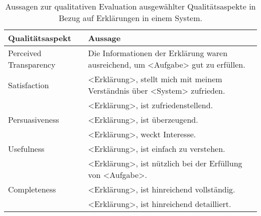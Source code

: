 \begin{table}[htb!]
    \begin{center}
        \begin{tabular}{|p{} p{}|}
            \hline
            \textbf{Qualitätsaspekt} & \textbf{Aussage} \\
            \hline
            \hline
            Perceived Transparency    & Die Informationen der Erklärung waren ausreichend, um <Aufgabe> gut zu erfüllen. 
                                \cite[vgl.][]{wang_is_2018, balog_measuring_2020} \\
            \hline
            Satisfaction    & <Erklärung>, stellt mich mit meinem Verständnis über <System> zufrieden.
                                \cite[vgl.][]{riveiro_thats_2021} \\
                            & <Erklärung>, ist zufriedenstellend.
                                \cite[vgl.][]{riveiro_thats_2021, hoffman_metrics_nodate, balog_measuring_2020} \\
            \hline
            Persuasiveness  & <Erklärung>, ist überzeugend.
                                \cite[vgl.][]{sato_action-triggering_2019, sato_context_nodate} \\
                            & <Erklärung>, weckt Interesse. 
                                \cite[vgl.][]{sato_action-triggering_2019, sato_context_nodate} \\
            \hline
            Usefulness      & <Erklärung>, ist einfach zu verstehen. 
                                \cite[vgl.][]{sato_action-triggering_2019, sato_context_nodate} \\
                            & <Erklärung>, ist nützlich bei der Erfüllung von <Aufgabe>.
                                \cite[vgl.][]{sato_action-triggering_2019, sato_context_nodate, hoffman_metrics_nodate, balog_measuring_2020} \\
            \hline
            Completeness    & <Erklärung>, ist hinreichend vollständig.
                                \cite[vgl.][]{hoffman_metrics_nodate, riveiro_thats_2021} \\
                            & <Erklärung>, ist hinreichend detailliert.
                                \cite[vgl.][]{riveiro_thats_2021} \\
            \hline
        \end{tabular}
    \end{center}
    \caption{Aussagen zur qualitativen Evaluation ausgewählter Qualitätsaspekte in Bezug auf Erklärungen in einem System.}
    \label{tab:evaluation_qualitative_explanation_measures}
\end{table}

